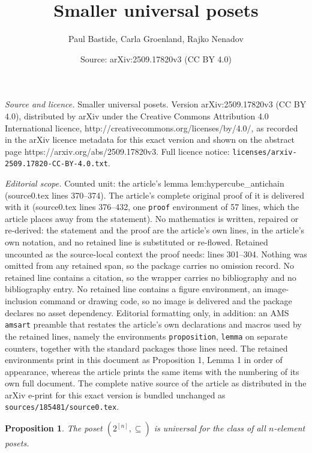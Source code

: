 \documentclass[10pt,a4paper]{amsart}
\title{Smaller universal posets}
\author{Paul Bastide, Carla Groenland, Rajko Nenadov}
\date{Source: arXiv:2509.17820v3 (CC BY 4.0)}
\newtheorem{proposition}{Proposition}
\begin{document}
\maketitle

\noindent\emph{Source and licence.} Smaller universal posets. Version arXiv:2509.17820v3 (CC BY 4.0), distributed by arXiv under the Creative Commons Attribution 4.0 International licence, http://creativecommons.org/licenses/by/4.0/, as recorded in the arXiv licence metadata for this exact version and shown on the abstract page https://arxiv.org/abs/2509.17820v3. Full licence notice: \texttt{licenses/arxiv-2509.17820-CC-BY-4.0.txt}.\par\smallskip

\noindent\textit{Editorial scope.} Counted unit: the article's lemma lem:hypercube\_antichain (source0.tex lines 370--374). The article's complete original proof of it is delivered with it (source0.tex lines 376--432, one \texttt{proof} environment of 57 lines, which the article places away from the statement). No mathematics is written, repaired or re-derived: the statement and the proof are the article's own lines, in the article's own notation, and no retained line is substituted or re-flowed.  Retained uncounted as the source-local context the proof needs: lines 301--304.  Nothing was omitted from any retained span, so the package carries no omission record.  No retained line contains a citation, so the wrapper carries no bibliography and no bibliography entry.  No retained line contains a figure environment, an image-inclusion command or drawing code, so no image is delivered and the package declares no asset dependency.  Editorial formatting only, in addition: an AMS \texttt{amsart} preamble that restates the article's own declarations and macros used by the retained lines, namely the environments \texttt{proposition}, \texttt{lemma} on separate counters, together with the standard packages those lines need.  The retained environments print in this document as Proposition 1, Lemma 1 in order of appearance, whereas the article prints the same items with the numbering of its own full document.  The complete native source of the article as distributed in the arXiv e-print for this exact version is bundled unchanged as \texttt{sources/185481/source0.tex}.
\begin{proposition}
    \label{prop:hypercube_univ}
    The poset $(2^{[n]},\subseteq)$ is universal for the class of all $n$-element posets.
\end{proposition}
\end{document}
